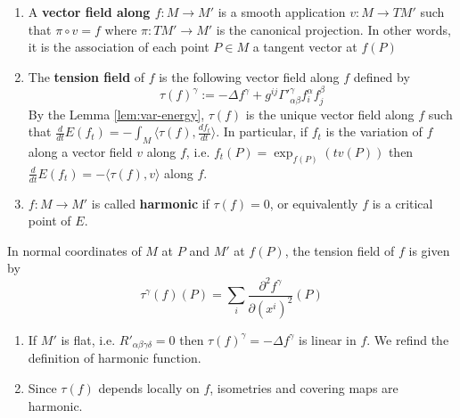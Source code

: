 \begin{definition}
\begin{enumerate}
\item A \textbf{vector field along \(f: M \longrightarrow M'\)} is a smooth application \(v: M\longrightarrow TM'\) such that \(\pi\circ v = f\) where \(\pi: TM' \longrightarrow M'\) is the canonical projection. In other words, it is the association of each point \(P\in M\) a tangent vector at \(f(P)\)
\item The \textbf{tension field} of \(f\) is the following vector field along \(f\) defined by
\[
   \tau(f)^\gamma:= -\Delta f^\gamma +g^{ij}\Gamma'^{\gamma}_{\alpha\beta} f^{\alpha}_{i}f^{\beta}_{j}
   \]
By the Lemma \ref{lem:var-energy}, \(\tau(f)\) is the unique vector field along \(f\)
such that \(\frac{d }{dt}E(f_t) = -\int_M \langle \tau(f), \frac{df_t}{dt}\rangle\). In
particular, if \(f_t\) is the variation of \(f\) along a vector field \(v\) along
\(f\), i.e. \(f_t(P) = \exp_{f(P)}(tv(P))\) then \(\frac{d}{dt} E(f_t) = - \langle \tau(f), v
   \rangle\) along \(f\).
\item \(f: M \longrightarrow M'\) is called \textbf{harmonic} if \(\tau(f)=0\), or equivalently
\(f\) is a critical point of \(E\).
\end{enumerate}
\end{definition}

In normal coordinates of \(M\) at \(P\) and \(M'\) at \(f(P)\), the tension field
of \(f\) is given by
\[
\tau^\gamma(f)(P) = \sum_i \frac{\partial^2 f^\gamma}{\partial (x^i)^2}(P)
\]

\begin{remark}
\begin{enumerate}
\item If \(M'\) is flat, i.e. \(R'_{\alpha\beta\gamma\delta} = 0\) then \(\tau(f)^\gamma
   = -\Delta f^\gamma\) is linear in \(f\). We refind the definition of harmonic function.
\item Since \(\tau(f)\) depends locally on \(f\), isometries and covering maps are
harmonic.
\end{enumerate}
\end{remark}

